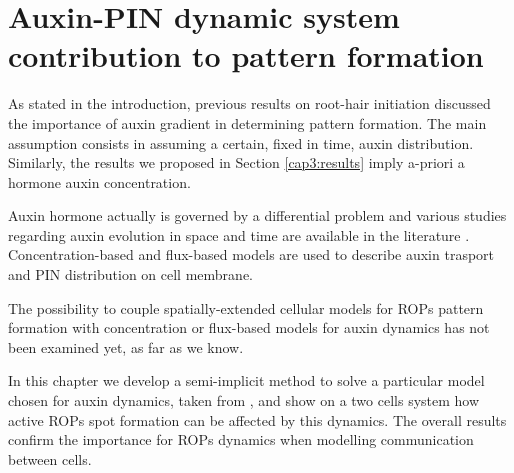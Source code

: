 \chapter{Auxin-PIN dynamic system contribution to pattern formation}\label{cap:4}
As stated in the introduction, previous results on root-hair initiation \cite{intra2, intra1_R, phdthesis:victor} discussed the importance of auxin gradient in determining pattern formation. The main assumption consists in assuming a certain, fixed in time, auxin distribution. Similarly, the results we proposed in Section \ref{cap3:results} imply a-priori a hormone auxin concentration.

Auxin hormone actually is governed by a differential problem and various studies regarding auxin evolution in space and time are available in the literature \cite{plant:Alim, plant:Farcot, plant:Mironova}. Concentration-based and flux-based models are used to describe auxin trasport and PIN distribution on cell membrane.

The possibility to couple spatially-extended cellular models for ROPs pattern formation with concentration or flux-based models for auxin dynamics has not been examined yet, as far as we know.

In this chapter we develop a semi-implicit method to solve a particular model chosen for auxin dynamics, taken from \cite{plant:Farcot}, and show on a two cells system how active ROPs spot formation can be affected by this dynamics. The overall results confirm the importance for ROPs dynamics when modelling communication between cells.


